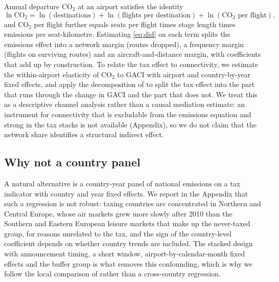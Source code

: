 Annual departure CO$_2$ at an airport satisfies the identity
\begin{equation}
\ln \text{CO}_2 = \ln(\text{destinations}) + \ln(\text{flights per destination}) + \ln(\text{CO}_2 \text{ per flight}),
\label{eq:decomp}
\end{equation}
and CO$_2$ per flight further equals seats per flight times stage length times emissions per
seat-kilometre. Estimating \eqref{eq:did} on each term splits the emissions effect into a network
margin (routes dropped), a frequency margin (flights on surviving routes) and an aircraft-and-distance
margin, with coefficients that add up by construction. To relate the tax effect to connectivity, we
estimate the within-airport elasticity of CO$_2$ to GACI with airport and country-by-year fixed
effects, and apply the decomposition of \citet{gelbach2016} to split the tax effect into the part that
runs through the change in GACI and the part that does not. We treat this as a descriptive channel
analysis rather than a causal mediation estimate: an instrument for connectivity that is excludable from
the emissions equation and strong in the tax stacks is not available (Appendix), so we do not claim
that the network share identifies a structural indirect effect.

\subsection{Why not a country panel}

A natural alternative is a country-year panel of national emissions on a tax indicator with country and
year fixed effects. We report in the Appendix that such a regression is not robust: taxing countries are
concentrated in Northern and Central Europe, whose air markets grew more slowly after 2010 than the
Southern and Eastern European leisure markets that make up the never-taxed group, for reasons unrelated
to the tax, and the sign of the country-level coefficient depends on whether country trends are
included. The stacked design with announcement timing, a short window, airport-by-calendar-month fixed
effects and the buffer group is what removes this confounding, which is why we follow the local
comparison of \citet{li2019subway} rather than a cross-country regression.
